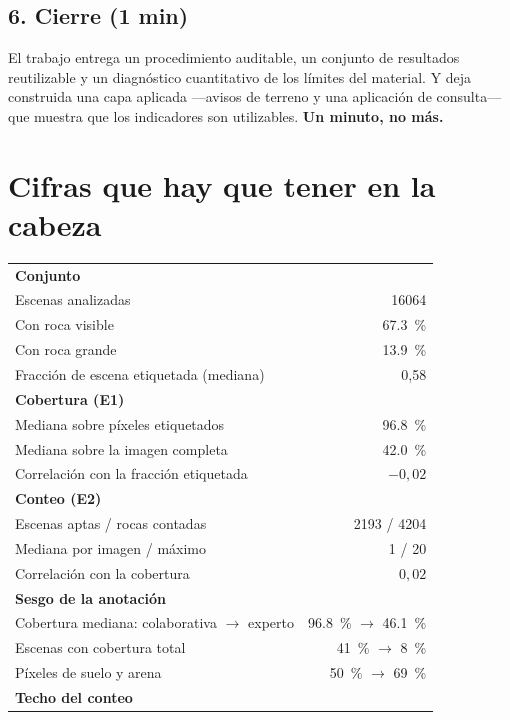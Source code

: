 \documentclass[11pt]{article}
\begin{document}
\subsection*{6. Cierre (1 min)}

El trabajo entrega un procedimiento auditable, un conjunto de resultados reutilizable y un
diagnóstico cuantitativo de los límites del material. Y deja construida una capa aplicada
—avisos de terreno y una aplicación de consulta— que muestra que los indicadores son
utilizables. \textbf{Un minuto, no más.}

\newpage
\section{Cifras que hay que tener en la cabeza}

\begin{table}[h]
\centering\small
\begin{tabular}{lr}
\toprule
\multicolumn{2}{l}{\textbf{Conjunto}}\\
Escenas analizadas & \num{16064}\\
Con roca visible & \SI{67.3}{\percent}\\
Con roca grande & \SI{13.9}{\percent}\\
Fracción de escena etiquetada (mediana) & 0,58\\
\midrule
\multicolumn{2}{l}{\textbf{Cobertura (E1)}}\\
Mediana sobre píxeles etiquetados & \SI{96.8}{\percent}\\
Mediana sobre la imagen completa & \SI{42.0}{\percent}\\
Correlación con la fracción etiquetada & $-0{,}02$\\
\midrule
\multicolumn{2}{l}{\textbf{Conteo (E2)}}\\
Escenas aptas / rocas contadas & \num{2193} / \num{4204}\\
Mediana por imagen / máximo & 1 / 20\\
Correlación con la cobertura & $0{,}02$\\
\midrule
\multicolumn{2}{l}{\textbf{Sesgo de la anotación}}\\
Cobertura mediana: colaborativa $\to$ experto & \SI{96.8}{\percent} $\to$ \SI{46.1}{\percent}\\
Escenas con cobertura total & \SI{41}{\percent} $\to$ \SI{8}{\percent}\\
Píxeles de suelo y arena & \SI{50}{\percent} $\to$ \SI{69}{\percent}\\
\midrule
\multicolumn{2}{l}{\textbf{Techo del conteo}}\\

\end{tabular}
\end{table}
\end{document}
